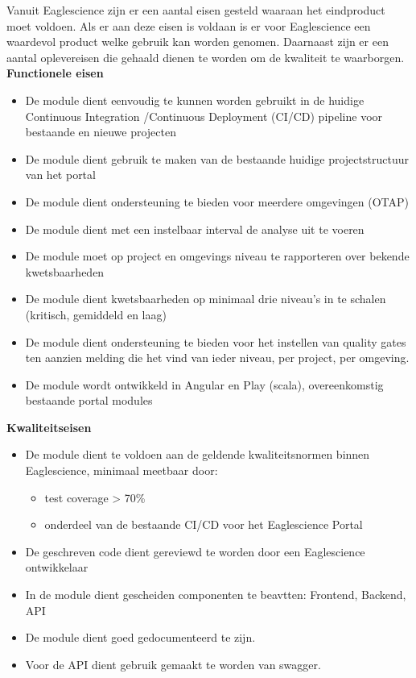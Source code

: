 Vanuit Eaglescience zijn er een aantal eisen gesteld waaraan het eindproduct moet voldoen.
Als er aan deze eisen is voldaan is er voor Eaglescience een waardevol product welke gebruik kan worden genomen.
Daarnaast zijn er een aantal oplevereisen die gehaald dienen te worden om de kwaliteit te waarborgen. \\

\textbf{Functionele eisen}
\begin{itemize}
\item De module dient eenvoudig te kunnen worden gebruikt in de huidige Continuous Integration /Continuous Deployment (CI/CD) pipeline voor bestaande en nieuwe projecten
\item De module dient gebruik te maken van de bestaande huidige projectstructuur van het portal
\item De module dient ondersteuning te bieden voor meerdere omgevingen (OTAP)
\item De module dient met een instelbaar interval de analyse uit te voeren
\item De module moet op project en omgevings niveau te rapporteren over bekende kwetsbaarheden
\item De module dient kwetsbaarheden op minimaal drie niveau’s in te schalen (kritisch, gemiddeld en laag)
\item De module dient ondersteuning te bieden voor het instellen van quality gates ten aanzien melding die het vind van ieder niveau, per project, per omgeving.
\item De module wordt ontwikkeld in Angular en Play (scala), overeenkomstig bestaande portal modules
\end{itemize}
\textbf{Kwaliteitseisen}
\begin{itemize}
\item De module dient te voldoen aan de geldende kwaliteitsnormen binnen Eaglescience, minimaal meetbaar door:
	\begin{itemize}
	\item test coverage > 70\%
	\item onderdeel van de bestaande CI/CD voor het Eaglescience Portal
	\end{itemize}
\item De geschreven code dient gereviewd te worden door een Eaglescience ontwikkelaar
\item In de module dient gescheiden componenten te beavtten: Frontend, Backend, API
\item De module dient goed gedocumenteerd te zijn.
\item Voor de API dient gebruik gemaakt te worden van swagger.
\end{itemize}

